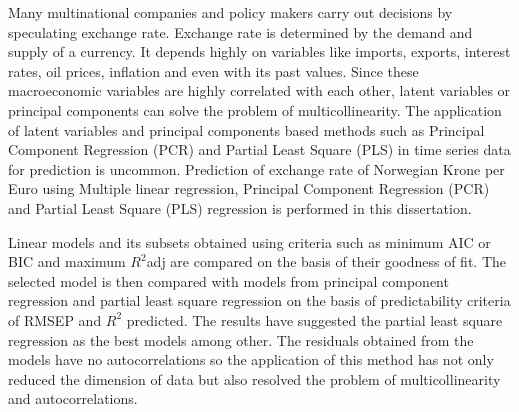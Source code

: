 Many multinational companies and policy makers carry out decisions by speculating exchange rate. Exchange rate is determined by the demand and supply of a currency. It depends highly on variables like imports, exports, interest rates, oil prices, inflation and even with its past values. Since these macroeconomic variables are highly correlated with each other, latent variables or principal components can solve the problem of multicollinearity. The application of latent variables and principal components based methods such as Principal Component Regression (PCR) and Partial Least Square (PLS) in time series data for prediction is uncommon. Prediction of exchange rate of Norwegian Krone per Euro using Multiple linear regression, Principal Component Regression (PCR) and Partial Least Square (PLS) regression is performed in this dissertation.

Linear models and its subsets obtained using criteria such as minimum AIC or BIC and maximum $R^2$adj are compared on the basis of their goodness of fit. The selected model is then compared with models from principal component regression and partial least square regression on the basis of predictability criteria of RMSEP and $R^2$ predicted. The results have suggested the partial least square regression as the best models among other. The residuals obtained from the models have no autocorrelations so the application of this method has not only reduced the dimension of data but also resolved the problem of multicollinearity and autocorrelations.